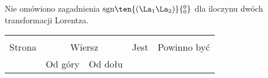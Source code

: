 \documentclass[a4paper,11pt]{article}
\begin{document}










\start {} Nie omówiono zagadnienia
$\sgn\ten{( \La_{ 1 } \La_{ 2 } )}{^0_0}$ dla iloczynu dwóch
transformacji Lorentza.











\begin{center}
  \begin{tabular}{|c|c|c|c|c|}
    \hline
    & \multicolumn{2}{c|}{} & & \\
    Strona & \multicolumn{2}{c|}{Wiersz} & Jest & Powinno być \\ \cline{2-3}
    & Od góry & Od dołu &  &  \\ \hline
    \hline
  \end{tabular}
\end{center}
\end{document}
